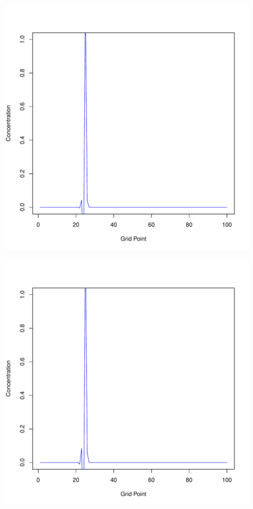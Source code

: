 \documentclass{tufte-handout}\usepackage[]{graphicx}\usepackage[]{xcolor}
\makeatletter
\def\maxwidth{ %
  \ifdim\Gin@nat@width>\linewidth
    \linewidth
  \else
    \Gin@nat@width
  \fi
}
\newenvironment{knitrout}{}{} %
\makeatother
\begin{document}
\begin{knitrout}
\includegraphics[width=\maxwidth]{figure/unnamed-chunk-1-3} 

\includegraphics[width=\maxwidth]{figure/unnamed-chunk-1-4} 


\end{knitrout}
\end{document}
